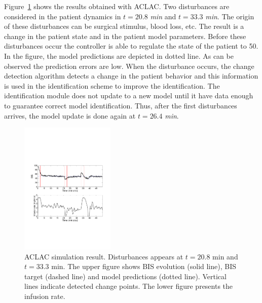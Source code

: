 Figure~\ref{fig:fig2ColsedLoopContrlSim} shows the results obtained with ACLAC.
Two disturbances are considered in the patient
dynamics in $t = 20.8$ \emph{min} and $t = 33.3$ \emph{min}. The origin of these disturbances
can be surgical stimulus, blood loss, etc. The result is a change in
the patient state and in the patient model parameters.
Before these disturbances occur the controller is able to regulate the state of the patient to 50.
%
In the figure, the model predictions are
depicted in dotted line. As can be observed the prediction errors are low.
When the disturbance occurs, the change detection algorithm detects a
change in the patient behavior and this information is used in the identification scheme to improve the identification.
%
The identification module does not update to a new model until it have data enough to guarantee correct model identification.
%
Thus, after the first disturbances arrives, the model update is done again at $t = 26.4$ \emph{min}.
\begin{figure}[htb!]
\centering
\includegraphics[width=0.40\textwidth]{./articles/pics/aclac_paper/fig2ColsedLoopContrlSim.pdf}%
\caption{ACLAC simulation result. Disturbances appears at $t = 20.8$ min and $t = 33.3$ min. The upper figure shows BIS evolution (solid line), BIS target (dashed line) and model predictions (dotted line). Vertical lines indicate detected change points. The lower figure presents the infusion rate.}
\label{fig:fig2ColsedLoopContrlSim}
\end{figure}

